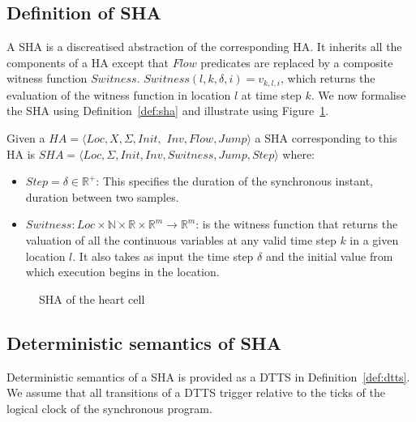 \subsection{Definition of \acf{SHA}}

A \ac{SHA} is a discreatised  abstraction of the corresponding \ac{HA}. It inherits all the
components of a \ac{HA} except that $Flow$ predicates are replaced by a
composite witness function $Switness$.
$Switness(l,k, \delta, i)=v_{k,l,i}$, which returns the evaluation of
the witness function in location $l$ at time step $k$.
We now formalise
the \ac{SHA} using Definition~\ref{def:sha} and illustrate using Figure~\ref{fig:heartCellSHA}.



\begin{definition}
	Given a 
	$HA = \langle Loc, X, \Sigma, Init,$ $ Inv, Flow, Jump \rangle$ a \ac{SHA} corresponding to
	this \ac{HA} is \newline
	$SHA = \langle Loc,  \Sigma, Init, Inv, Switness, Jump, Step \rangle$ where:
	\begin{itemize}
		\item $Step = \delta \in \mathbb{R}^+$: This specifies the duration of the synchronous instant,  duration between 
		two samples.
		\item
		$Switness: Loc \times \mathbb{N} \times \mathbb{R} \times
		\mathbb{R}^m \rightarrow \mathbb{R}^m$:
		is the witness function that returns the valuation of all the
		continuous variables at any valid time step $k$ in a given location
		$l$. It also takes as input the time step $\delta$ and the initial
		value from which execution begins in the location.
	\end{itemize}
	\label{def:sha}
\end{definition}


\begin{figure}
	\centering
	
	\caption{\acf{SHA} of the heart cell \label{fig:heartCellSHA}}
\end{figure}

\subsection{Deterministic semantics of \ac{SHA}}
Deterministic semantics of a \ac{SHA} is provided as a \acf{DTTS} in
Definition~\ref{def:dtts}. We assume that all transitions of a \acf{DTTS}
trigger relative to the ticks of the logical clock of the synchronous
program.

